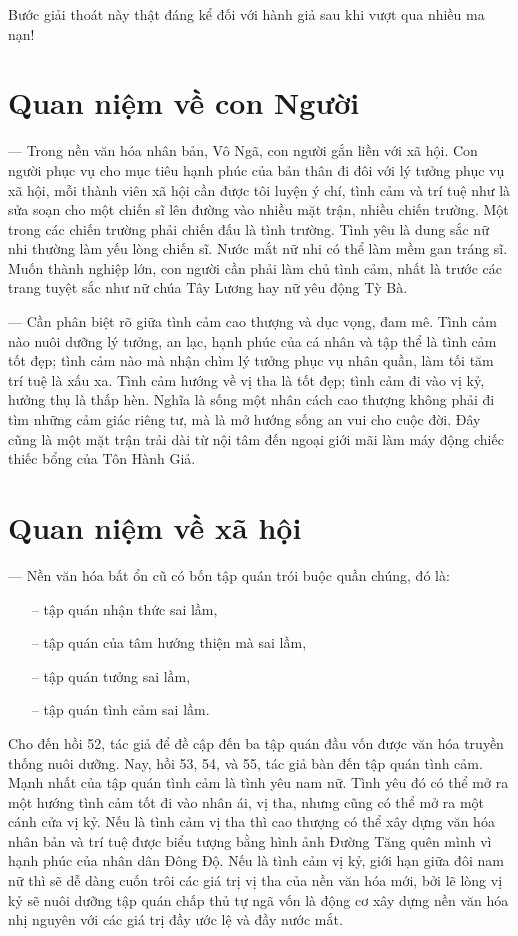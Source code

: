 Bước giải thoát này thật đáng kể đối với hành giả sau khi vượt qua nhiều ma nạn!

\section{Quan niệm về con Người} %
\label{sec:53_54_con_nguoi}

— Trong nền văn hóa nhân bản, Vô Ngã, con người gắn liền với xã hội. Con người phục vụ cho mục tiêu hạnh phúc của bản thân đi đôi với lý tưởng phục vụ xã hội, mỗi thành viên xã hội cần được tôi luyện ý chí, tình cảm và trí tuệ như là sửa soạn cho một chiến sĩ lên đường vào nhiều mặt trận, nhiều chiến trường. Một trong các chiến trường phải chiến đấu là tình trường. Tình yêu là dung sắc nữ nhi thường làm yếu lòng chiến sĩ. Nước mắt nữ nhi có thể làm mềm gan tráng sĩ. Muốn thành nghiệp lớn, con người cần phải làm chủ tình cảm, nhất là trước các trang tuyệt sắc như nữ chúa Tây Lương hay nữ yêu động Tỳ Bà.

— Cần phân biệt rõ giữa tình cảm cao thượng và dục vọng, đam mê. Tình cảm nào nuôi dưỡng lý tưởng, an lạc, hạnh phúc của cá nhân và tập thể là tình cảm tốt đẹp; tình cảm nào mà nhận chìm lý tưởng phục vụ nhân quần, làm tối tăm trí tuệ là xấu xa. Tình cảm hướng về vị tha là tốt đẹp; tình cảm đi vào vị kỷ, hưởng thụ là thấp hèn. Nghĩa là sống một nhân cách cao thượng không phải đi tìm những cảm giác riêng tư, mà là mở hướng sống an vui cho cuộc đời. Đây cũng là một mặt trận trải dài từ nội tâm đến ngoại giới mãi làm máy động chiếc thiếc bổng của Tôn Hành Giả.

\section{Quan niệm về xã hội} %
\label{sec:53_54_xa_hoi}

— Nền văn hóa bất ổn cũ có bốn tập quán trói buộc quần chúng, đó là:
\begin{itemize}
    \item[–] tập quán nhận thức sai lầm,
    \item[–] tập quán của tâm hướng thiện mà sai lầm,
    \item[–] tập quán tưởng sai lầm,
    \item[–] tập quán tình cảm sai lầm.
\end{itemize}

Cho đến hồi 52, tác giả để đề cập đến ba tập quán đầu vốn được văn hóa truyền thống nuôi dưỡng. Nay, hồi 53, 54, và 55, tác giả bàn đến tập quán tình cảm. Mạnh nhất của tập quán tình cảm là tình yêu nam nữ. Tình yêu đó có thể mở ra một hướng tình cảm tốt đi vào nhân ái, vị tha, nhưng cũng có thể mở ra một cánh cửa vị kỷ. Nếu là tình cảm vị tha thì cao thượng có thể xây dựng văn hóa nhân bản và trí tuệ được biểu tượng bằng hình ảnh Đường Tăng quên mình vì hạnh phúc của nhân dân Đông Độ. Nếu là tình cảm vị kỷ, giới hạn giữa đôi nam nữ thì sẽ dễ dàng cuốn trôi các giá trị vị tha của nền văn hóa mới, bởi lẽ lòng vị kỷ sẽ nuôi dưỡng tập quán chấp thủ tự ngã vốn là động cơ xây dựng nền văn hóa nhị nguyên với các giá trị đầy ước lệ và đầy nước mắt.


